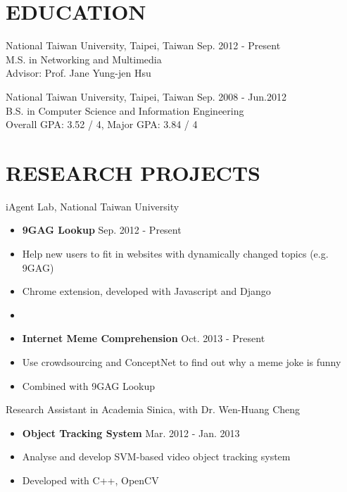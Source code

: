 \documentclass[margin]{main}
\begin{document}
 
 

\address{
    4F., No.10, Aly. 4, Ln. 201, Yucheng St., \\
    Nangang Dist., Taipei City 115, \\
    Taiwan (R.O.C)
}

\address{
    \hfill +886-923-869-910 \\
    \hfill john.lin.chichin@gmail.com \\
    \hfill \url{http://github.com/averangeall}
}

\begin{resume}
 
\section{EDUCATION}
National Taiwan University, Taipei, Taiwan \hfill Sep. 2012 - Present \\
M.S. in Networking and Multimedia \\
Advisor: Prof. Jane Yung-jen Hsu
 
National Taiwan University, Taipei, Taiwan \hfill Sep. 2008 - Jun.2012 \\
B.S. in Computer Science and Information Engineering \\
Overall GPA: 3.52 / 4, Major GPA: 3.84 / 4

\section{RESEARCH PROJECTS}
iAgent Lab, National Taiwan University
\begin{itemize} \itemsep -2pt
    \item[] {\bf 9GAG Lookup} \hfill Sep. 2012 - Present
    \item[] Help new users to fit in websites with dynamically changed topics (e.g. 9GAG)
    \item[] Chrome extension, developed with Javascript and Django
    \item[]
    \item[] {\bf Internet Meme Comprehension} \hfill Oct. 2013 - Present
    \item[] Use crowdsourcing and ConceptNet to find out why a meme joke is funny
    \item[] Combined with 9GAG Lookup
\end{itemize}

Research Assistant in Academia Sinica, with Dr. Wen-Huang Cheng
\begin{itemize} \itemsep -2pt
    \item[] {\bf Object Tracking System} \hfill Mar. 2012 - Jan. 2013
    \item[] Analyse and develop SVM-based video object tracking system
    \item[] Developed with C++, OpenCV
\end{itemize}


\end{resume}
\end{document}
